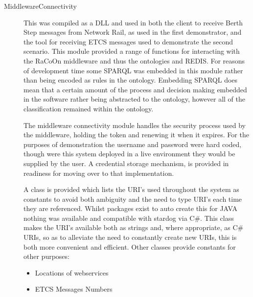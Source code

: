 \begin{description}
    \item[MiddlewareConnectivity]
    This was compiled as a DLL and used in both the client to receive Berth Step messages from Network Rail, as used in the first demonstrator, and the tool for receiving ETCS messages used to demonstrate the second scenario. This module provided a range of functions for interacting with the RaCoOn middleware and thus the ontologies and REDIS. For reasons of development time some SPARQL   was embedded in this module rather than being encoded as rules in the ontology. Embedding SPARQL does mean that a certain amount of the process and decision making embedded in the software rather being abstracted to the ontology, however all of the classification remained within the ontology.    

    The middleware connectivity module handles the security process used by the middleware, holding the token and renewing it when it expires. For the purposes of demonstration the username and password were hard coded, though were this system deployed in a live environment they would be supplied by the user. A credential storage mechanism, is provided in readiness for moving over to that implementation. 

    A class is provided which lists the URI's used throughout the system as constants to avoid both ambiguity and the need to type URI's each time they are referenced. Whilst packages exist to auto create this for JAVA nothing was available and compatible with stardog via C\#. This class makes the URI's available both as strings and, where appropriate, as C\# URIs, so as to alleviate the need to constantly create new URIs, this is both more convenient and efficient. Other classes provide constants for other purposes:
    \begin{itemize}
        \item Locations of webservices
        \item ETCS Messages Numbers
    \end{itemize}


\end{description}
